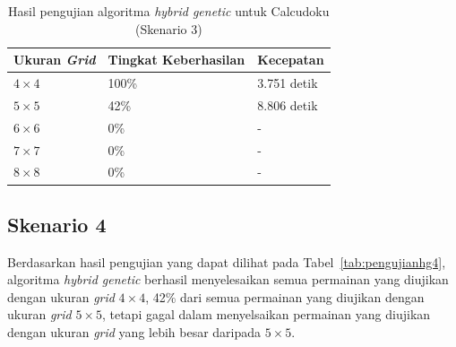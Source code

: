 \begin{table}
\centering
\captionsetup{justification=centering}
\caption[Hasil pengujian algoritma \textit{hybrid genetic} untuk Calcudoku (Skenario 3)]{Hasil pengujian algoritma \textit{hybrid genetic} untuk Calcudoku (Skenario 3)}
\begin{tabular}{| l | l | l |}
\hline
Ukuran \textit{Grid} & Tingkat Keberhasilan & Kecepatan \\
\hline \hline
\begin{math}4 \times 4\end{math} & 100\% & 3.751 detik \\
\hline
\begin{math}5 \times 5\end{math} & 42\% & 8.806 detik \\
\hline
\begin{math}6 \times 6\end{math} & 0\% & - \\
\hline
\begin{math}7 \times 7\end{math} & 0\% & - \\
\hline
\begin{math}8 \times 8\end{math} & 0\% & - \\
\hline
\end{tabular}
\label{tab:pengujianhg3}
\end{table}

\subsection{Skenario 4}
\label{sec:skenario4}

Berdasarkan hasil pengujian yang dapat dilihat pada Tabel~\ref{tab:pengujianhg4}, algoritma \textit{hybrid genetic} berhasil menyelesaikan semua permainan yang diujikan dengan ukuran \textit{grid} \begin{math}4 \times 4\end{math}, 42\% dari semua permainan yang diujikan dengan ukuran \textit{grid} \begin{math}5 \times 5\end{math}, tetapi gagal dalam menyelsaikan permainan yang diujikan dengan ukuran \textit{grid} yang lebih besar daripada \begin{math}5 \times 5\end{math}.

